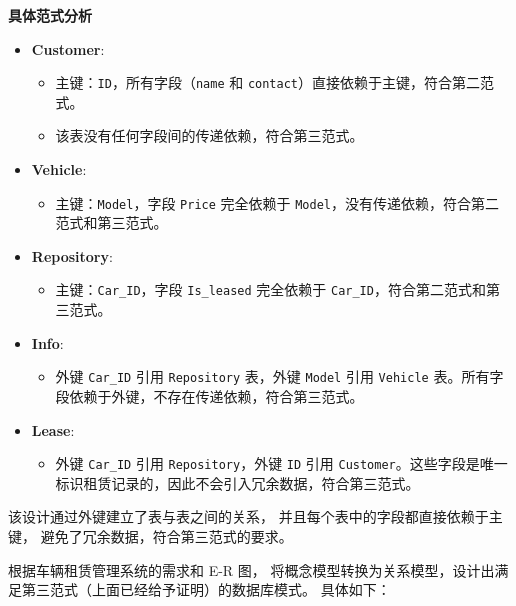 \documentclass[UTF8,a4paper,12pt]{ctexart}
\begin{document}
\textbf{具体范式分析}

\begin{itemize}
    \item \textbf{Customer}:
    \begin{itemize}
        \item 主键：\texttt{ID}，所有字段（\texttt{name} 和 \texttt{contact}）直接依赖于主键，符合第二范式。
        \item 该表没有任何字段间的传递依赖，符合第三范式。
    \end{itemize}
    
    \item \textbf{Vehicle}:
    \begin{itemize}
        \item 主键：\texttt{Model}，字段 \texttt{Price} 完全依赖于 \texttt{Model}，没有传递依赖，符合第二范式和第三范式。
    \end{itemize}
    
    \item \textbf{Repository}:
    \begin{itemize}
        \item 主键：\texttt{Car\_ID}，字段 \texttt{Is\_leased} 完全依赖于 \texttt{Car\_ID}，符合第二范式和第三范式。
    \end{itemize}
    
    \item \textbf{Info}:
    \begin{itemize}
        \item 外键 \texttt{Car\_ID} 引用 \texttt{Repository} 表，外键 \texttt{Model} 引用 \texttt{Vehicle} 表。所有字段依赖于外键，不存在传递依赖，符合第三范式。
    \end{itemize}
    
    \item \textbf{Lease}:
    \begin{itemize}
        \item 外键 \texttt{Car\_ID} 引用 \texttt{Repository}，外键 \texttt{ID} 引用 \texttt{Customer}。这些字段是唯一标识租赁记录的，因此不会引入冗余数据，符合第三范式。
    \end{itemize}
\end{itemize}


该设计通过外键建立了表与表之间的关系，
并且每个表中的字段都直接依赖于主键，
避免了冗余数据，符合第三范式的要求。




根据车辆租赁管理系统的需求和 E-R 图，
将概念模型转换为关系模型，设计出满足第三范式（上面已经给予证明）的数据库模式。
具体如下：
\end{document}
